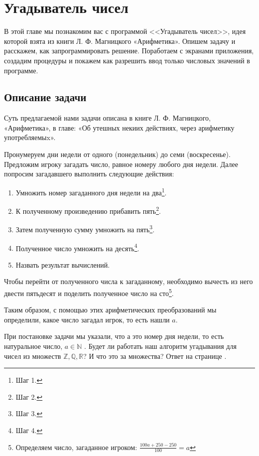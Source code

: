 \chapter{Угадыватель чисел}
\label{ch:guessnumbers}

В этой главе мы познакомим вас с программой <<Угадыватель чисел>>\cite{PanfilovaApp}, идея которой взята из книги Л. Ф. Магницкого «Арифметика»\cite{Galanin}. 
Опишем задачу и расскажем, как запрограммировать решение. Поработаем с экранами приложения, создадим процедуры и покажем как разрешить ввод только числовых значений в программе.


\section{Описание задачи}

Суть предлагаемой нами задачи описана в книге Л. Ф. Магницкого, «Арифметика», в главе: «Об утешных некиих действиях, через арифметику употребляемыx»\cite{Galanin}.

Пронумеруем дни недели от одного (понедельник) до семи (воскресенье). 
Предложим игроку загадать число, равное номеру любого дня недели. Далее попросим загадавшего выполнить следующие действия:
\begin{enumerate}
\item Умножить номер загаданного дня недели на два\footnote[][-0cm]{Шаг 1.}. 
\item К полученному произведению прибавить пять\footnote[][-0cm]{Шаг 2.}.
\item Затем полученную сумму умножить на пять\footnote[][-0cm]{Шаг 3.}.
\item Полученное число умножить на десять\footnote[][-0cm]{Шаг 4.}.
\item Назвать результат вычислений.
\end{enumerate}

Чтобы перейти от полученного числа к загаданному, необходимо вычесть из него двести пятьдесят и поделить полученное число на сто\footnote[][-0cm]{Определяем число, загаданное игроком: $\frac{100  a + 250 - 250}{100} =  a $}. 

Таким образом, с помощью этих арифметических преобразований мы определили, какое число загадал игрок, то есть нашли $ a $.
\begin{mdfstyle}[nobreak=true,frametitle=Вопрос о числовых множествах]
  \sloppy 
  При постановке задачи мы указали, что а это номер дня недели, то есть натуральное число, $ a \in \mathbb{N} $ . Будет ли работать наш алгоритм угадывания для чисел из множеств $\mathbb{Z}, \mathbb{Q}, \mathbb{R} $? И что это за множества?  
  Ответ на странице \pageref{answer:guess_numbers_task}.
  \label{question:text}
\end{mdfstyle}

